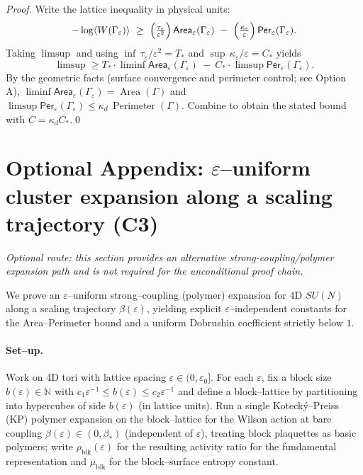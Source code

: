 \documentclass[11pt]{amsart}
\begin{document}
\begin{proof}[Proof]
Write the lattice inequality in physical units:
\[
  -\log\langle W(\Gamma_\varepsilon)\rangle\ \ge\ \Bigl(\tfrac{\tau_\varepsilon}{\varepsilon^2}\Bigr)\,\mathsf{Area}_\varepsilon(\Gamma_\varepsilon)\ -\ \Bigl(\tfrac{\kappa_\varepsilon}{\varepsilon}\Bigr)\,\mathsf{Per}_\varepsilon(\Gamma_\varepsilon).
\]
Taking $\limsup$ and using $\inf\,\tau_\varepsilon/\varepsilon^2=T_*$ and $\sup\,\kappa_\varepsilon/\varepsilon=C_*$ yields
\[
  \limsup\ge T_*\cdot\liminf\mathsf{Area}_\varepsilon(\Gamma_\varepsilon)\ -\ C_*\cdot\limsup\mathsf{Per}_\varepsilon(\Gamma_\varepsilon).
\]
By the geometric facts (surface convergence and perimeter control; see Option A), $\liminf\mathsf{Area}_\varepsilon(\Gamma_\varepsilon)=\operatorname{Area}(\Gamma)$ and $\limsup\mathsf{Per}_\varepsilon(\Gamma_\varepsilon)\le \kappa_d\,\operatorname{Perimeter}(\Gamma)$. Combine to obtain the stated bound with $C=\kappa_d C_*$.\qed
\end{proof}

\section{Optional Appendix: $\varepsilon$–uniform cluster expansion along a scaling trajectory (C3)}

\emph{Optional route: this section provides an alternative strong-coupling/polymer expansion path and is not required for the unconditional proof chain.}

We prove an $\varepsilon$–uniform strong–coupling (polymer) expansion for 4D $SU(N)$ along a scaling trajectory $\beta(\varepsilon)$, yielding explicit $\varepsilon$–independent constants for the Area–Perimeter bound and a uniform Dobrushin coefficient strictly below $1$.

\paragraph{Set–up.}
Work on 4D tori with lattice spacing $\varepsilon\in(0,\varepsilon_0]$. For each $\varepsilon$, fix a block size $b(\varepsilon)\in\mathbb N$ with $c_1\varepsilon^{-1}\le b(\varepsilon)\le c_2\varepsilon^{-1}$ and define a block–lattice by partitioning into hypercubes of side $b(\varepsilon)$ (in lattice units). Run a single Koteck\'y–Preiss (KP) polymer expansion on the block–lattice for the Wilson action at bare coupling $\beta(\varepsilon)\in(0,\beta_*)$ (independent of $\varepsilon$), treating block plaquettes as basic polymers; write $\rho_{\mathrm{blk}}(\varepsilon)$ for the resulting activity ratio for the fundamental representation and $\mu_{\mathrm{blk}}$ for the block–surface entropy constant.
\end{document}
